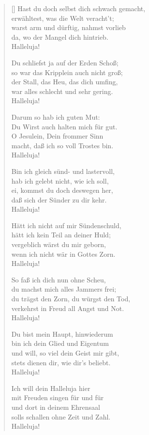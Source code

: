 \begin{multicols}{2}
\begin{verse}[\versewidth]
   Hast du doch selbst dich schwach gemacht,\\
  erwähltest, was die Welt veracht't;\\
  warst arm und dürftig, nahmst vorlieb\\
  da, wo der Mangel dich hintrieb.\\
  Halleluja!

   Du schliefst ja auf der Erden Schoß;\\
  so war das Kripplein auch nicht groß;\\
  der Stall, das Heu, das dich umfing,\\
  war alles schlecht und sehr gering.\\
  Halleluja!

   Darum so hab ich guten Mut:\\
  Du Wirst auch halten mich für gut.\\
  O Jesulein, Dein frommer Sinn\\
  macht, daß ich so voll Trostes bin.\\
  Halleluja!

  Bin ich gleich sünd- und lastervoll,\\
  hab ich gelebt nicht, wie ich soll,\\
  ei, kommst du doch deswegen her,\\
  daß sich der Sünder zu dir kehr.\\
  Halleluja!

   Hätt ich nicht auf mir Sündenschuld,\\
  hätt ich kein Teil an deiner Huld;\\
  vergeblich wärst du mir geborn,\\
  wenn ich nicht wär in Gottes Zorn.\\
  Halleluja!

   So faß ich dich nun ohne Scheu,\\
  du machst mich alles Jammers frei;\\
  du trägst den Zorn, du würgst den Tod,\\
  verkehrst in Freud all Angst und Not.\\
  Halleluja!

   Du bist mein Haupt, hinwiederum\\
  bin ich dein Glied und Eigentum\\
  und will, so viel dein Geist mir gibt,\\
  stets dienen dir, wie dir's beliebt.\\
  Halleluja!

   Ich will dein Halleluja hier\\
  mit Freuden singen für und für\\
  und dort in deinem Ehrensaal\\
  solls schallen ohne Zeit und Zahl.\\
  Halleluja!

\end{verse}
\end{multicols}
